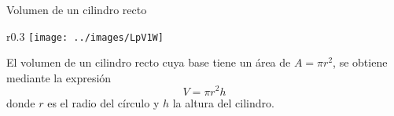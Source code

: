 
\begin{infocard}{Volumen de un cilindro recto}
    \begin{wrapfigure}{r}{0.3\linewidth}
        \centering
        \texttt{[image: ../images/LpV1W]}
    \end{wrapfigure}
    El volumen de un cilindro recto cuya base tiene un área de $A=\pi r^2$, se obtiene mediante la expresión
    \[  V = \pi r^2h  \]
    donde $r$ es el radio del círculo y $h$ la altura del cilindro.
\end{infocard}



